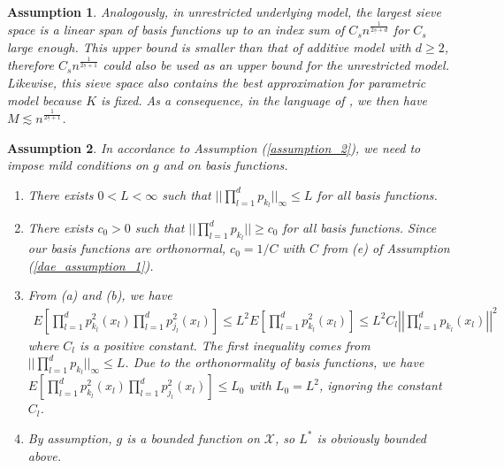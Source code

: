 \documentclass[12pt, a4paper]{article}
\theoremstyle{MAstyle} \newtheorem{assumption}{Assumption}[section]
\theoremstyle{MAstyle} \newtheorem{definition}{Definition}[section]
\theoremstyle{MAstyle} \newtheorem{theorem}{Theorem}[section]
\theoremstyle{MAstyle} \newtheorem{corollary}{Corollary}[section]
\begin{document}
\begin{assumption}
                        Analogously, in unrestricted underlying model, the largest sieve space is a linear span of basis functions up to an index sum of $C_sn^{\frac{1}{2\underline{s}+d}}$ for $C_s$ large enough. This upper bound is smaller than that of additive model with $d \ge 2$, therefore $C_sn^{\frac{1}{2\underline{s}+1}}$ could also be used as an upper bound for the unrestricted model. Likewise, this sieve space also contains the best approximation for parametric model because $K$ is fixed. As a consequence, in the language of \cite{Bunea_2007}, we then have $M \lesssim n^{\frac{1}{2\underline{s}+1}}$.
                    \end{assumption}

                    \begin{assumption}\label{dae_assumption_2}
                        In accordance to Assumption (\ref{assumption_2}), we need to impose mild conditions on $g$ and on basis functions.
                        \begin{enumerate}[label=(\alph*), noitemsep]
                            \item There exists $0<L<\infty$ such that $||\prod_{l=1}^d p_{k_l}||_{\infty} \le L$ for all basis functions. 
                            \item There exists $c_0 >0$ such that $||\prod_{l=1}^d p_{k_l}|| \ge c_0$ for all basis functions. Since our basis functions are orthonormal, $c_0=1/C$ with $C$ from (e) of Assumption (\ref{dae_assumption_1}).
                            \item From (a) and (b), we have
                            \begin{align*}
                                E\left[\prod_{l=1}^d p_{k_l}^2(x_l)\prod_{l=1}^d p_{j_l}^2(x_l)\right] \le L^2E\left[\prod_{l=1}^d p_{k_l}^2(x_l)\right] \le L^2C_l\left|\left|\prod_{l=1}^d p_{k_l}(x_l)\right|\right|^2
                            \end{align*}
                            where $C_l$ is a positive constant. The first inequality comes from $||\prod_{l=1}^d p_{k_l}||_{\infty} \le L$. Due to the orthonormality of basis functions, we have $E\left[\prod_{l=1}^d p_{k_l}^2(x_l)\prod_{l=1}^d p_{j_l}^2(x_l)\right] \le L_0$ with $L_0=L^2$, ignoring the constant $C_l$.
                            \item By assumption, $g$ is a bounded function on $\mathcal{X}$, so $L^{*}$ is obviously bounded above.
                        \end{enumerate}
                    \end{assumption}
                    
\end{document}
